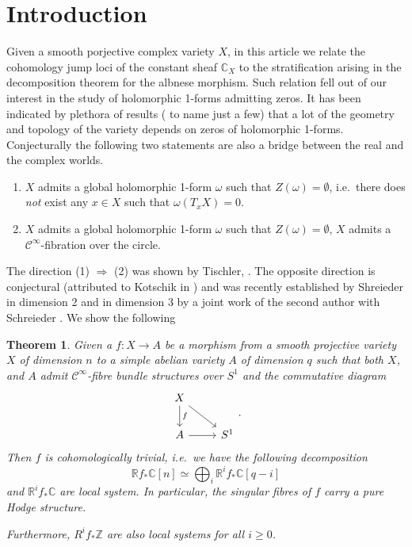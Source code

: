 \documentclass[12pt,reqno]{amsart}
\newtheorem{alphtheorem}{Theorem}
\theoremstyle{question}
\theoremstyle{definition}
\theoremstyle{remark}
\theoremstyle{cited}
\theoremstyle{citeddef}
\newcommand{\bbC}{\mathbb{C}}
\newcommand{\bbR}{\mathbb{R}}
\newcommand{\bbZ}{\mathbb{Z}}
\newcommand{\scrC}{\mathscr{C}}
\begin{document}
\section{Introduction}\label{intro}
Given a smooth porjective complex variety $X$, in this article we relate the cohomology jump loci of the constant sheaf $\bbC_X$ to the 
stratification arising in the decomposition theorem for the albnese morphism. Such relation fell out of our interest in the
study of holomorphic 1-forms admitting zeros. It has been indicated by plethora of results
(\cite{GL87, HK05, LZ05,
Sch19, HS19, PS14} to name just a few) that a lot of the geometry and topology of the
variety depends on zeros of holomorphic 1-forms. Conjecturally the following two statements
are also a bridge between the real and the complex worlds.
\begin{enumerate}
	\item\label{kot1} $X$ admits a global holomorphic 1-form $\omega$
	such that $Z(\omega) = \emptyset$, i.e.\ there does \textsl{not}
	exist any $x\in X$ such that $\omega(T_xX) = 0$. 
	\item\label{kot2} $X$ admits a global holomorphic 1-form $\omega$
	such that $Z(\omega) = \emptyset$, $X$ admits a $\scrC^{\infty}$-fibration over the circle.
\end{enumerate}
The direction (1) $\Rightarrow$ (2) was shown by Tischler,
\cite{Tis70}. The opposite direction is conjectural (attributed
to Kotschik in \cite{Sch19}) and
was recently established by Shreieder in dimension 2 and in dimension 3 by a joint work of the second author with Schreieder
\cite{HS19}. We show the following 



\begin{alphtheorem}\label{thm:smooth}
Given a $f\colon X\to A$ be a morphism from a smooth projective variety $X$ of dimension $n$ to a simple abelian variety $A$ 
of dimension $q$ such that
both $X$, and $A$ admit $\scrC^{\infty}$-fibre bundle structures over $S^1$ and the commutative diagram
\[\begin{tikzcd}
	X\ar[dr]\ar[d, "f"]& \\
	A\ar[r]&S^1
\end{tikzcd}.\] 
Then $f$ is cohomologically trivial, i.e.\ we have the following
decomposition
\[\bbR f_*\bbC[n] \simeq \bigoplus_i \bbR^i f_*\bbC[q-i]\]
and $\bbR^i f_*\bbC$ are local system. In particular, the
singular fibres of $f$ carry a pure Hodge structure.

Furthermore, 
$R^if_*\bbZ$ are also local systems for 
all $i\geq 0$.

\end{alphtheorem}
\end{document}
